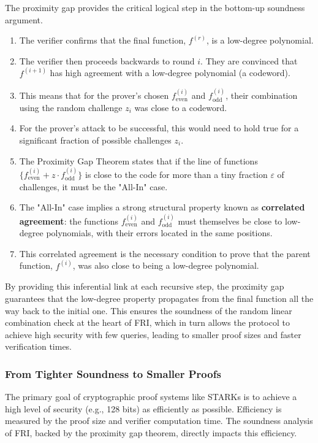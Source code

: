 \documentclass{article}
\begin{document}
\begin{tcolorbox}[breakable, title={How the Proximity Gap Secures FRI}]
The proximity gap provides the critical logical step in the bottom-up soundness argument.
\begin{enumerate}
    \item The verifier confirms that the final function, $f^{(r)}$, is a low-degree polynomial.
    \item The verifier then proceeds backwards to round $i$. They are convinced that $f^{(i+1)}$ has high agreement with a low-degree polynomial (a codeword).
    \item This means that for the prover's chosen $f^{(i)}_{\text{even}}$ and $f^{(i)}_{\text{odd}}$, their combination using the random challenge $z_i$ was close to a codeword.
    \item For the prover's attack to be successful, this would need to hold true for a significant fraction of possible challenges $z_i$.
    \item The Proximity Gap Theorem states that if the line of functions $\{ f^{(i)}_{\text{even}} + z \cdot f^{(i)}_{\text{odd}} \}$ is close to the code for more than a tiny fraction $\varepsilon$ of challenges, it must be the "All-In" case.
    \item The "All-In" case implies a strong structural property known as \textbf{correlated agreement}: the functions $f^{(i)}_{\text{even}}$ and $f^{(i)}_{\text{odd}}$ must themselves be close to low-degree polynomials, with their errors located in the same positions.
    \item This correlated agreement is the necessary condition to prove that the parent function, $f^{(i)}$, was also close to being a low-degree polynomial.
\end{enumerate}
By providing this inferential link at each recursive step, the proximity gap guarantees that the low-degree property propagates from the final function all the way back to the initial one. This ensures the soundness of the random linear combination check at the heart of FRI, which in turn allows the protocol to achieve high security with few queries, leading to smaller proof sizes and faster verification times.
\end{tcolorbox}


\subsubsection{From Tighter Soundness to Smaller Proofs}
The primary goal of cryptographic proof systems like STARKs is to achieve a high level of security (e.g., 128 bits) as efficiently as possible. Efficiency is measured by the proof size and verifier computation time. The soundness analysis of FRI, backed by the proximity gap theorem, directly impacts this efficiency.
\end{document}

